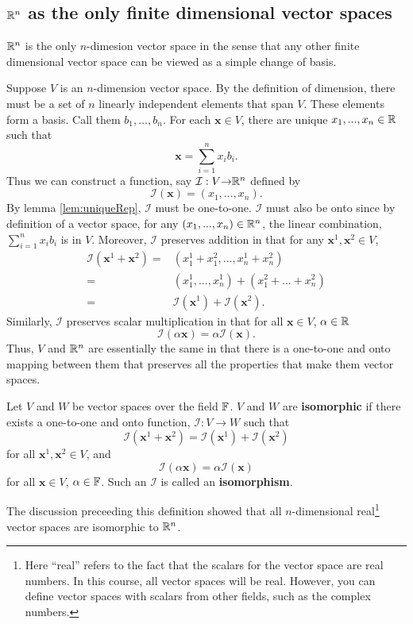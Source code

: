 \subsection{$\mathbb{R}^n$ as the  only finite dimensional vector spaces}

$\mathbb{R}^n$ is the only $n$-dimesion vector space in the sense that any
other finite dimensional vector space can be viewed as a simple change
of basis.

Suppose $V$ is an $n$-dimension vector space. By the definition of dimension,
there must be a set of $n$ linearly independent elements that span
$V$. These elements form a basis. Call them $b_1, ..., b_n$. For each
$\mathbf{x} \in V$, there are unique $x_1, ..., x_n \in \mathbb{R}$ such that 
\[ \mathbf{x} = \sum_{i=1}^n x_i b_i. \]
Thus we can construct a function, say $\mathcal{I}: V {\rightarrow} \mathbb{R}^n$ defined by 
\[ \mathcal{I}(\mathbf{x}) = (x_1, ..., x_n). \]
By lemma \ref{lem:uniqueRep}, $\mathcal{I}$ must be one-to-one. $\mathcal{I}$ must also be
onto since by definition of a vector space, for any $(x_1, ..., x_n)
\in \mathbb{R}^n$, the linear combination, $\sum_{i=1}^n x_i b_i$ is in
$V$. Moreover, $\mathcal{I}$ preserves addition in that for
any $\mathbf{x}^1, \mathbf{x}^2 \in V$,
\begin{align*}
  \mathcal{I}(\mathbf{x}^1 + \mathbf{x}^2) = & (x_1^1 + x_1^2, ..., x_n^1 + x_n^2) \\
  = & (x_1^1, ..., x_n^1) + (x_1^2 + ... + x_n^2) \\
  = & \mathcal{I}(\mathbf{x}^1) + \mathcal{I}(\mathbf{x}^2).
\end{align*}
Similarly, $\mathcal{I}$ preserves scalar multiplication in that for all $\mathbf{x} \in
V$, $\alpha \in \mathbb{R}$
\[ \mathcal{I}(\alpha \mathbf{x}) = \alpha \mathcal{I}(\mathbf{x}). \]
Thus, $V$ and $\mathbb{R}^n$ are essentially the same in that there is a
one-to-one and onto mapping between them that preserves all the
properties that make them vector spaces. 
\begin{definition}
  Let $V$ and $W$ be vector spaces over the field $\mathbb{F}$. $V$ and $W$ are
  \textbf{isomorphic} if there exists a one-to-one and onto function,
  $\mathcal{I}:V \to W$ such that 
  \[ \mathcal{I}(\mathbf{x}^1 + \mathbf{x}^2) =
  \mathcal{I}(\mathbf{x}^1) + \mathcal{I}(\mathbf{x}^2) \] for all
  $\mathbf{x}^1, \mathbf{x}^2 \in V$, and
  \[ \mathcal{I}(\alpha \mathbf{x}) = \alpha \mathcal{I}(\mathbf{x}) \]
  for all $\mathbf{x} \in V$, $\alpha \in \mathbb{F}$.
  Such an $\mathcal{I}$ is called an \textbf{isomorphism}.
\end{definition}
The discussion preceeding this definition showed that all
$n$-dimensional real\footnote{Here ``real'' refers to the fact that
  the scalars for the vector space are real numbers. In this course,
  all vector spaces will be real. However, you can define vector
  spaces with scalars from other fields, such as the complex numbers.}
vector spaces are isomorphic to $\mathbb{R}^n$. 

